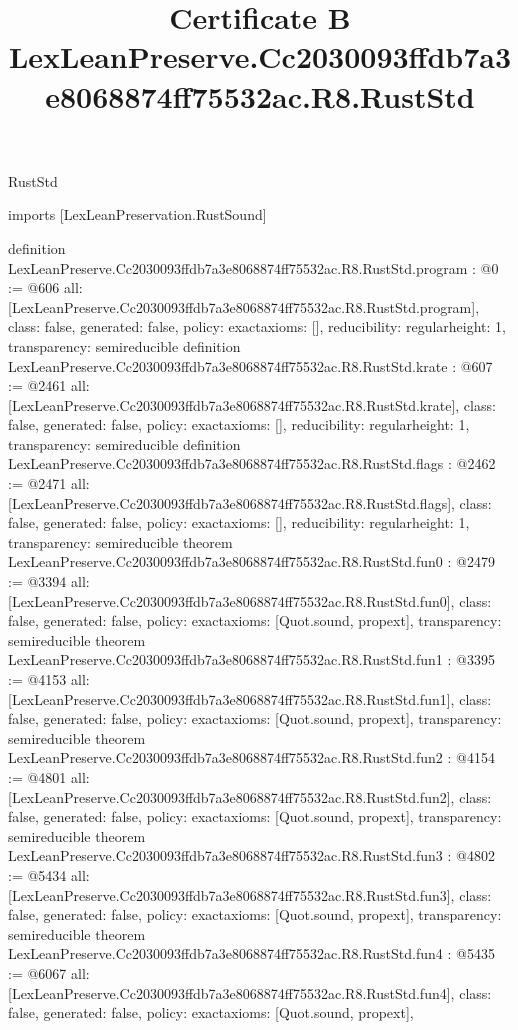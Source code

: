 \begin{lexlean}{RustStd}
\title{Certificate B LexLeanPreserve.Cc2030093ffdb7a3e8068874ff75532ac.R8.RustStd}
\begin{coremodule}
imports [LexLeanPreservation.RustSound]

definition LexLeanPreserve.Cc2030093ffdb7a3e8068874ff75532ac.R8.RustStd.program : @0 := @606 {
  all: [LexLeanPreserve.Cc2030093ffdb7a3e8068874ff75532ac.R8.RustStd.program],
  class: false,
  generated: false,
  policy: exact{axioms: []},
  reducibility: regular{height: 1},
  transparency: semireducible
}
definition LexLeanPreserve.Cc2030093ffdb7a3e8068874ff75532ac.R8.RustStd.krate : @607 := @2461 {
  all: [LexLeanPreserve.Cc2030093ffdb7a3e8068874ff75532ac.R8.RustStd.krate],
  class: false,
  generated: false,
  policy: exact{axioms: []},
  reducibility: regular{height: 1},
  transparency: semireducible
}
definition LexLeanPreserve.Cc2030093ffdb7a3e8068874ff75532ac.R8.RustStd.flags : @2462 := @2471 {
  all: [LexLeanPreserve.Cc2030093ffdb7a3e8068874ff75532ac.R8.RustStd.flags],
  class: false,
  generated: false,
  policy: exact{axioms: []},
  reducibility: regular{height: 1},
  transparency: semireducible
}
theorem LexLeanPreserve.Cc2030093ffdb7a3e8068874ff75532ac.R8.RustStd.fun0 : @2479 := @3394 {
  all: [LexLeanPreserve.Cc2030093ffdb7a3e8068874ff75532ac.R8.RustStd.fun0],
  class: false,
  generated: false,
  policy: exact{axioms: [Quot.sound, propext]},
  transparency: semireducible
}
theorem LexLeanPreserve.Cc2030093ffdb7a3e8068874ff75532ac.R8.RustStd.fun1 : @3395 := @4153 {
  all: [LexLeanPreserve.Cc2030093ffdb7a3e8068874ff75532ac.R8.RustStd.fun1],
  class: false,
  generated: false,
  policy: exact{axioms: [Quot.sound, propext]},
  transparency: semireducible
}
theorem LexLeanPreserve.Cc2030093ffdb7a3e8068874ff75532ac.R8.RustStd.fun2 : @4154 := @4801 {
  all: [LexLeanPreserve.Cc2030093ffdb7a3e8068874ff75532ac.R8.RustStd.fun2],
  class: false,
  generated: false,
  policy: exact{axioms: [Quot.sound, propext]},
  transparency: semireducible
}
theorem LexLeanPreserve.Cc2030093ffdb7a3e8068874ff75532ac.R8.RustStd.fun3 : @4802 := @5434 {
  all: [LexLeanPreserve.Cc2030093ffdb7a3e8068874ff75532ac.R8.RustStd.fun3],
  class: false,
  generated: false,
  policy: exact{axioms: [Quot.sound, propext]},
  transparency: semireducible
}
theorem LexLeanPreserve.Cc2030093ffdb7a3e8068874ff75532ac.R8.RustStd.fun4 : @5435 := @6067 {
  all: [LexLeanPreserve.Cc2030093ffdb7a3e8068874ff75532ac.R8.RustStd.fun4],
  class: false,
  generated: false,
  policy: exact{axioms: [Quot.sound, propext]},
}
\end{coremodule}
\end{lexlean}
